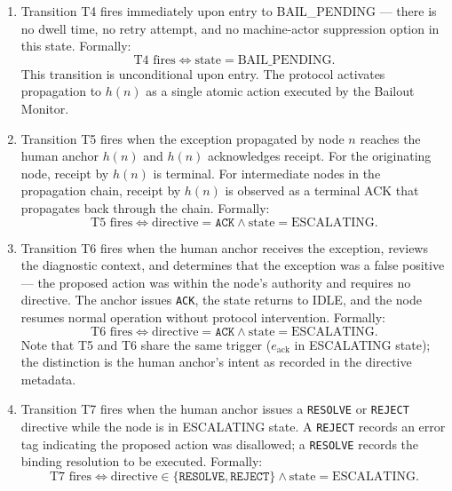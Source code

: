 \begin{enumerate}
\item[\textbf{T4: BAIL\_PENDING $\rightarrow$ ESCALATING (protocol activation).}] Transition T4 fires immediately upon entry to BAIL\_PENDING — there is no dwell time, no retry attempt, and no machine-actor suppression option in this state. Formally:
\begin{equation}
\text{T4 fires} \iff \text{state} = \text{BAIL\_PENDING}. \tag{T4}
\end{equation}
This transition is unconditional upon entry. The protocol activates propagation to $h(n)$ as a single atomic action executed by the Bailout Monitor.

\item[\textbf{T5: ESCALATING $\rightarrow$ HUMAN\_ACKNOWLEDGED (anchor receipt).}] Transition T5 fires when the exception propagated by node $n$ reaches the human anchor $h(n)$ and $h(n)$ acknowledges receipt. For the originating node, receipt by $h(n)$ is terminal. For intermediate nodes in the propagation chain, receipt by $h(n)$ is observed as a terminal ACK that propagates back through the chain. Formally:
\begin{equation}
\text{T5 fires} \iff \text{directive} = \texttt{ACK} \land \text{state} = \text{ESCALATING}. \tag{T5}
\end{equation}

\item[\textbf{T6: ESCALATING $\rightarrow$ IDLE (false positive).}] Transition T6 fires when the human anchor receives the exception, reviews the diagnostic context, and determines that the exception was a false positive — the proposed action was within the node's authority and requires no directive. The anchor issues \texttt{ACK}, the state returns to IDLE, and the node resumes normal operation without protocol intervention. Formally:
\begin{equation}
\text{T6 fires} \iff \text{directive} = \texttt{ACK} \land \text{state} = \text{ESCALATING}. \tag{T6}
\end{equation}
Note that T5 and T6 share the same trigger ($e_{\text{ack}}$ in ESCALATING state); the distinction is the human anchor's intent as recorded in the directive metadata.

\item[\textbf{T7: ESCALATING $\rightarrow$ RESOLVED (binding resolution from escalation).}] Transition T7 fires when the human anchor issues a \texttt{RESOLVE} or \texttt{REJECT} directive while the node is in ESCALATING state. A \texttt{REJECT} records an error tag indicating the proposed action was disallowed; a \texttt{RESOLVE} records the binding resolution to be executed. Formally:
\begin{equation}
\text{T7 fires} \iff \text{directive} \in \{\texttt{RESOLVE}, \texttt{REJECT}\} \land \text{state} = \text{ESCALATING}. \tag{T7}
\end{equation}


\end{enumerate}
